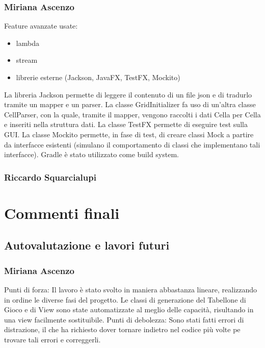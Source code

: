 \documentclass[a4paper,12pt]{report}
\begin{document}
	\subsection{Miriana Ascenzo}

	Feature avanzate usate:
	\begin{itemize}
		\item lambda
		\item stream
		\item librerie esterne (Jackson, JavaFX, TestFX, Mockito)
	\end {itemize}
	La libreria Jackson permette di leggere il contenuto di un file json e di tradurlo tramite un mapper e un parser.
	La classe GridInitializer fa uso di un’altra classe CellParser, con la quale, tramite il mapper, vengono raccolti i dati Cella per Cella e inseriti nella struttura dati.
	La classe TestFX permette di eseguire test sulla GUI.
	La classe Mockito permette, in fase di test, di creare classi Mock a partire da interfacce esistenti (simulano il comportamento di classi che implementano tali interfacce).
    Gradle è stato utilizzato come build system.

	\subsection{Riccardo Squarcialupi}

	\chapter{Commenti finali}

    \section{Autovalutazione e lavori futuri}

    \subsection{Miriana Ascenzo}
    Punti di forza:
    Il lavoro è stato svolto in maniera abbastanza lineare, realizzando in ordine le diverse fasi del progetto.
    Le classi di generazione del Tabellone di Gioco e di View sono state automatizzate al meglio delle capacità, risultando in una view facilmente sostituibile. \newline
    Punti di debolezza:
    Sono stati fatti errori di distrazione, il che ha richiesto dover tornare indietro nel codice più volte pe trovare tali errori e correggerli.
\end{document}
